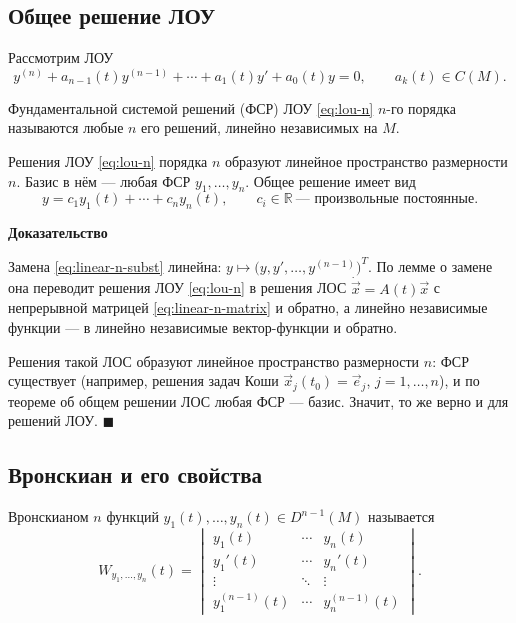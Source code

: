 \documentclass[12pt,a4paper]{article}
\numberwithin{equation}{section}
\newcommand{\R}{\mathbb{R}}
\newcommand{\vect}[1]{\vec{#1}}
\renewenvironment{proof}[1][Доказательство]{\begin{center}\textbf{#1}\end{center}}{\hfill$\blacksquare$\par}
\DeclareRobustCommand{\examtag}[1]{\space{\normalfont\small\color{HSEgray}(#1)}}
\begin{document}
\subsection{Общее решение ЛОУ}

Рассмотрим ЛОУ
\begin{equation}
y^{(n)}+a_{n-1}(t)y^{(n-1)}+\cdots+a_1(t)y'+a_0(t)y=0,\qquad a_k(t)\in C(M).
\label{eq:lou-n}
\end{equation}

\begin{definitionHSE}
Фундаментальной системой решений (ФСР) ЛОУ \eqref{eq:lou-n} \(n\)-го порядка называются любые \(n\) его решений, линейно независимых на \(M\).
\end{definitionHSE}

\begin{theoremHSE}
Решения ЛОУ \eqref{eq:lou-n} порядка \(n\) образуют линейное пространство размерности \(n\). Базис в нём --- любая ФСР \(y_1,\ldots,y_n\). Общее решение имеет вид
\[
y=c_1y_1(t)+\cdots+c_ny_n(t),\qquad c_i\in\R\ \text{--- произвольные постоянные}.
\]
\end{theoremHSE}

\begin{proof}
Замена \eqref{eq:linear-n-subst} линейна: \(y\mapsto\bigl(y,y',\ldots,y^{(n-1)}\bigr)^{T}\). По лемме о замене она переводит решения ЛОУ \eqref{eq:lou-n} в решения ЛОС \(\dot{\vect{x}}=A(t)\vect{x}\) с непрерывной матрицей \eqref{eq:linear-n-matrix} и обратно, а линейно независимые функции --- в линейно независимые вектор-функции и обратно.

Решения такой ЛОС образуют линейное пространство размерности \(n\): ФСР существует (например, решения задач Коши \(\vect{x}_j(t_0)=\vect{e}_j\), \(j=1,\ldots,n\)), и по теореме об общем решении ЛОС любая ФСР --- базис. Значит, то же верно и для решений ЛОУ.
\end{proof}

\subsection[Вронскиан функций и формула Лиувилля--Остроградского\examtag{вопрос~17}]{Вронскиан и его свойства\examtag{вопрос~17}}

\begin{definitionHSE}
Вронскианом \(n\) функций \(y_1(t),\ldots,y_n(t)\in D^{n-1}(M)\) называется
\begin{equation}
W_{y_1,\ldots,y_n}(t)=
\begin{vmatrix}
y_1(t)&\cdots&y_n(t)\\
y_1'(t)&\cdots&y_n'(t)\\
\vdots&\ddots&\vdots\\
y_1^{(n-1)}(t)&\cdots&y_n^{(n-1)}(t)
\end{vmatrix}.
\label{eq:wronskian-n}
\end{equation}
\end{definitionHSE}
\end{document}
